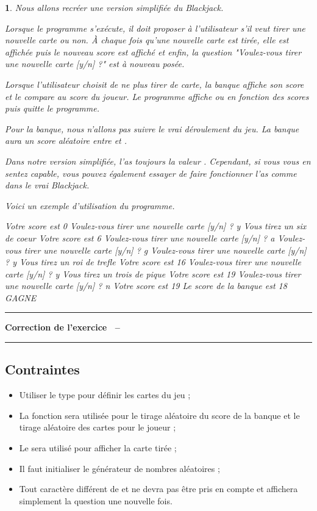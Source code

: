 \documentclass[a4paper]{article}
\newenvironment{Correction}{\par\tiny\blue\rule[1ex]{\textwidth}{1pt}\par\normalsize\textbf{\sffamily{}Correction de l'exercice~\theExo{} -- }}{\par\tiny\blue\rule[1ex]{\textwidth}{1pt}\par}
\newtheorem{Exo}{{\sffamily{Exercice}}}
\begin{document}
		\begin{Exo}
			Nous allons recréer une version simplifiée du \emph{Blackjack}.

			Lorsque le programme s'exécute, il doit proposer à l'utilisateur s'il veut tirer une nouvelle carte ou non.
			À chaque fois qu'une nouvelle carte est tirée, elle est affichée puis le nouveau score est affiché et enfin, la question "Voulez-vous tirer une nouvelle carte [y/n] ?" est à nouveau posée.

			Lorsque l'utilisateur choisit de ne plus tirer de carte, la banque affiche son score et le compare au score du joueur.
			Le programme affiche  ou  en fonction des scores puis quitte le programme.

			Pour la banque, nous n'allons pas suivre le vrai déroulement du jeu.
			La banque aura un score aléatoire entre  et .

			Dans notre version simplifiée, l'\emph{as} toujours la valeur .
			Cependant, si vous vous en sentez capable, vous pouvez également essayer de faire fonctionner l'\emph{as} comme dans le vrai \emph{Blackjack}.

			Voici un exemple d'utilisation du programme.
			\begin{Code*}[language=]
Votre score est 0
Voulez-vous tirer une nouvelle carte [y/n] ? y
Vous tirez un six de coeur
Votre score est 6
Voulez-vous tirer une nouvelle carte [y/n] ? a
Voulez-vous tirer une nouvelle carte [y/n] ? g
Voulez-vous tirer une nouvelle carte [y/n] ? y
Vous tirez un roi de trefle
Votre score est 16
Voulez-vous tirer une nouvelle carte [y/n] ? y
Vous tirez un trois de pique
Votre score est 19
Voulez-vous tirer une nouvelle carte [y/n] ? n
Votre score est 19
Le score de la banque est 18
GAGNE
			\end{Code*}
		\end{Exo}
		\begin{Correction}
		\end{Correction}

		\subsection{Contraintes}
			\begin{itemize}
				\item Utiliser le type  pour définir les cartes du jeu ;
				\item La fonction  sera utilisée pour le tirage aléatoire du score de la banque et le tirage aléatoire des cartes pour le joueur ;
				\item Le  sera utilisé pour afficher la carte tirée ;
				\item Il faut initialiser le générateur de nombres aléatoires ;
				\item Tout caractère différent de  et  ne devra pas être pris en compte et affichera simplement la question une nouvelle fois.
			\end{itemize}
\end{document}
